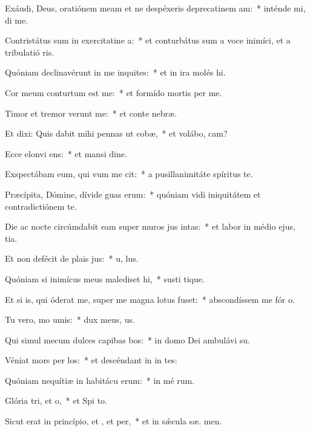 \item Exáudi, Deus, oratiónem meam et ne despéxeris deprecatinem am:~* inténde mi,  di me.
\item Contristátus sum in exercitatine a:~* et conturbátus sum a voce inimíci, et a tribulatió ris.
\item Quóniam declinavérunt in me inquites:~* et in ira molés  hi.
\item Cor meum conturtum est  me:~* et formído mortis  per me.
\item Timor et tremor verunt  me:~* et conte  nebræ.
\item Et dixi: Quis dabit mihi pennas ut cobæ,~* et volábo,  cam?
\item Ecce elonvi ens:~* et mansi  dine.
\item Exspectábam eum, qui vum me cit:~* a pusillanimitáte spíritus  te.
\item Præcípita, Dómine, dívide guas erum:~* quóniam vidi iniquitátem et contradictiónem  te.
\item Die ac nocte circúmdabit eam super muros jus intas:~* et labor in médio ejus,  tia.
\item Et non defécit de plais jus:~* u,  lus.
\item Quóniam si inimícus meus malediset hi,~* susti tique.
\item Et si is, qui óderat me, super me magna lotus fuset:~* abscondíssem me fór  o.
\item Tu vero, mo umis:~* dux meus,   us.
\item Qui simul mecum dulces capibas bos:~* in domo Dei ambulávi  su.
\item Véniat mors per los:~* et descéndant in in tes:
\item Quóniam nequítiæ in habitácu erum:~* in mé rum.
\item Glória tri, et o,~* et Spi to.
\item Sicut erat in princípio, et , et per,~* et in sǽcula sæ. men.
